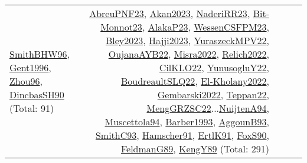 {\begin{longtable}{p{3cm}r>{\raggedright\arraybackslash}p{6cm}>{\raggedright\arraybackslash}p{6cm}>{\raggedright\arraybackslash}p{8cm}}
\hyperref[detail:SmithBHW96]{SmithBHW96}, \hyperref[detail:Gent1996]{Gent1996}, \hyperref[detail:Zhou96]{Zhou96}, \hyperref[detail:DincbasSH90]{DincbasSH90} (Total: 91) & \hyperref[detail:AbreuPNF23]{AbreuPNF23}, \hyperref[detail:Akan2023]{Akan2023}, \hyperref[detail:NaderiRR23]{NaderiRR23}, \hyperref[detail:Bit-Monnot23]{Bit-Monnot23}, \hyperref[detail:AlakaP23]{AlakaP23}, \hyperref[detail:WessenCSFPM23]{WessenCSFPM23}, \hyperref[detail:Bley2023]{Bley2023}, \hyperref[detail:Hajji2023]{Hajji2023}, \hyperref[detail:YuraszeckMPV22]{YuraszeckMPV22}, \hyperref[detail:OujanaAYB22]{OujanaAYB22}, \hyperref[detail:Misra2022]{Misra2022}, \hyperref[detail:Relich2022]{Relich2022}, \hyperref[detail:CilKLO22]{CilKLO22}, \hyperref[detail:YunusogluY22]{YunusogluY22}, \hyperref[detail:BoudreaultSLQ22]{BoudreaultSLQ22}, \hyperref[detail:El-Kholany2022]{El-Kholany2022}, \hyperref[detail:Gembarski2022]{Gembarski2022}, \hyperref[detail:Teppan22]{Teppan22}, \hyperref[detail:MengGRZSC22]{MengGRZSC22}...\hyperref[detail:NuijtenA94]{NuijtenA94}, \hyperref[detail:Muscettola94]{Muscettola94}, \hyperref[detail:Barber1993]{Barber1993}, \hyperref[detail:AggounB93]{AggounB93}, \hyperref[detail:SmithC93]{SmithC93}, \hyperref[detail:Hamscher91]{Hamscher91}, \hyperref[detail:ErtlK91]{ErtlK91}, \hyperref[detail:FoxS90]{FoxS90}, \hyperref[detail:FeldmanG89]{FeldmanG89}, \hyperref[detail:KengY89]{KengY89} (Total: 291)\\

\end{longtable}}

